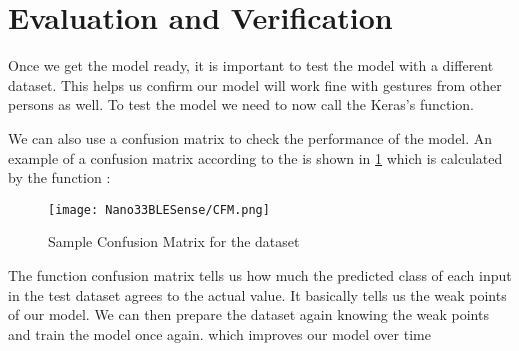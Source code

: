 %
% 

\section{Evaluation and Verification}

Once we get the model ready, it is important to test the model with a different dataset. This helps us confirm our model will work fine with gestures from other persons as well. To test the model we need to now call the Keras's  function.\cite{Warden:2020}



We can also use a confusion matrix to check the performance of the model. An example of a confusion matrix according to the \cite{Warden:2020} is shown in \ref{fig:CFM} which is calculated by the function :

\begin{figure}[h!]
    \texttt{[image: Nano33BLESense/CFM.png]}
    \caption{Sample Confusion Matrix for the dataset \cite{Warden:2020}}
    \label{fig:CFM}
\end{figure}



The function confusion matrix tells us how much the predicted class of each input in the test dataset agrees to the actual value. It basically tells us the weak points of our model. We can then prepare the dataset again knowing the weak points and train the model once again.\cite{Warden:2020} which improves our model over time




